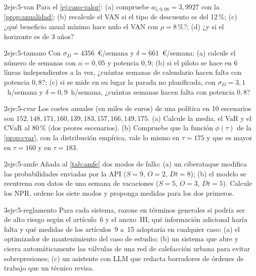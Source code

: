\begin{ejercicio}{2}{eje:5-van}
Para el \cref{ej:caso-valor}: (a) compruebe $a_{5;0{,}08}=3{,}9927$ con la \cref{prop:anualidad}; (b) recalcule el VAN si el tipo de descuento es del 12\,\%; (c) ¿qué beneficio anual mínimo hace nulo el VAN con $\rho=8\,\%$?; (d) ¿y si el horizonte es de 3 años?
\end{ejercicio}

\begin{ejercicio}{2}{eje:5-tamano}
Con $\sigma_D=4356$~€/semana y $\delta=661$~€/semana: (a) calcule el número de semanas con $\alpha=0{,}05$ y potencia $0{,}9$; (b) si el piloto se hace en 6 líneas independientes a la vez, ¿cuántas semanas de calendario hacen falta con potencia $0{,}8$?; (c) si se mide en su lugar la parada no planificada, con $\sigma_D=3{,}1$~h/semana y $\delta=0{,}9$~h/semana, ¿cuántas semanas hacen falta con potencia $0{,}8$?
\end{ejercicio}

\begin{ejercicio}{2}{eje:5-cvar}
Los costes anuales (en miles de euros) de una política en 10 escenarios son $152,148,171,160,139,183,157,166,149,175$. (a) Calcule la media, el VaR y el CVaR al 80\,\% (dos peores escenarios). (b) Compruebe que la función $\phi(\tau)$ de la \cref{prop:cvar}, con la distribución empírica, vale lo mismo en $\tau=175$ y que es mayor en $\tau=160$ y en $\tau=183$.
\end{ejercicio}

\begin{ejercicio}{2}{eje:5-amfe}
Añada al \cref{tab:amfe} dos modos de fallo: (a) un ciberataque modifica las probabilidades enviadas por la API ($S=9$, $O=2$, $Dt=8$); (b) el modelo se reentrena con datos de una semana de vacaciones ($S=5$, $O=3$, $Dt=5$). Calcule los NPR, ordene los siete modos y proponga medidas para los dos primeros.
\end{ejercicio}

\begin{ejercicio}{3}{eje:5-reglamento}
Para cada sistema, razone en términos generales si podría ser de alto riesgo según el artículo~6 y el anexo~III, qué información adicional haría falta y qué medidas de los artículos~9 a~15 adoptaría en cualquier caso: (a) el optimizador de mantenimiento del caso de estudio; (b) un sistema que abre y cierra automáticamente las válvulas de una red de calefacción urbana para evitar sobrepresiones; (c) un asistente con LLM que redacta borradores de órdenes de trabajo que un técnico revisa.
\end{ejercicio}
